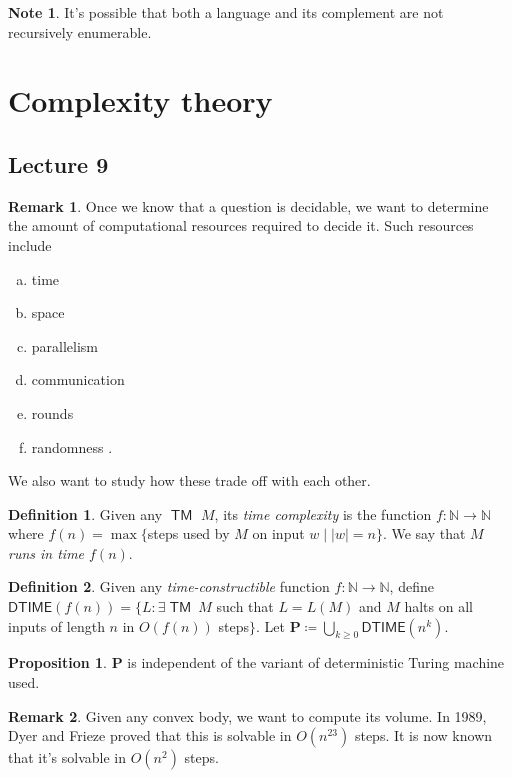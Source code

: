 \documentclass[10pt,letterpaper,cm]{nupset}
\theoremstyle{definition}
\newtheorem*{definition}{Definition}
\newtheorem{note}{Note}
\newtheorem{remark}{Remark}
\newtheorem{prop}{Proposition}
\newcommand{\N}{\mathbb N}
\newcommand{\1}{\mathbf{1}}
\newcommand{\0}{\vec 0}
\DeclareMathOperator{\TM}{\mathsf{TM}}
\begin{document}
\begin{note}
It's possible that both a language and its complement are not recursively enumerable. 
\end{note}

\newpage

\section{Complexity theory}

\subsection{Lecture 9}

\begin{remark}
Once we know that a question is decidable, we want to determine the amount of computational resources required to decide it. Such resources include 
\begin{enumerate}[(a)]
\item time
\item space
\item parallelism 
\item communication 
\item rounds
\item randomness
.\end{enumerate}
We also want to study how these trade off with each other. 
\end{remark}

\begin{definition}
Given any $\TM$ $M$, its \textit{time complexity} is the function $f: \N \to \N$ where $f(n) =\max\{$steps used by $M$ on input $w\mid |w| =n\}$. We say that $M$ \textit{runs in time $f(n)$}.
\end{definition}

\begin{definition}
 Given any \textit{time-constructible} function $f: \N \to \N$, define $\mathsf{DTIME}(f(n)) = \{ L : \exists \TM \ M$ such that $L = L(M)$ and $M$ halts on all inputs of length $n$ in $O(f(n))$ steps$\}$.
Let $\mathbf{P} \coloneqq \bigcup_{k\geq 0} \mathsf{DTIME}(n^k)$.
\end{definition}

\begin{prop}
$\mathbf{P}$ is independent of the variant of deterministic Turing machine used. 
\end{prop}

\begin{remark}
Given any convex body, we want to compute its volume. In 1989, Dyer and Frieze proved that this is solvable in $O(n^{23})$ steps. It is now known that it's solvable in $O(n^2)$ steps. 
\end{remark}
\end{document}

